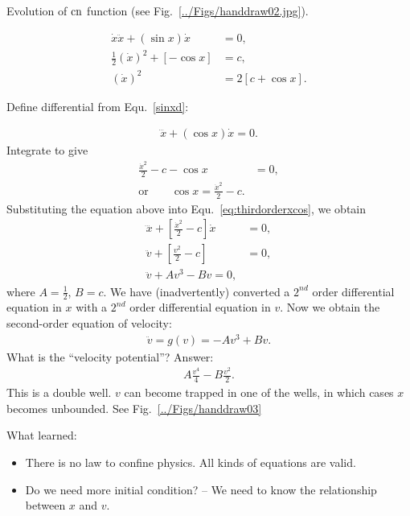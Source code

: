 Evolution of $\mathrm{cn}$ function (see Fig.~\ref{../Figs/handdraw02.jpg}).

\begin{align}
\dot{x}\ddot{x} + (\sin x) \dot{x} &=0,\\
\frac{1}{2} \left( \dot{x} \right)^2 +[-\cos x] &= c,\\
\left( \dot{x} \right)^2 &= 2[c +\cos x].
\end{align}

Define differential from Equ.~\ref{sinxd}:

\begin{align}
\dddot{x} + (\cos x)\dot{x} =0 . \label{eq:thirdorderxcos}
\end{align}
Integrate to give
\begin{align}
\frac{\dot{x}^2}{2}-c - \cos x &=0,\\
\textrm{or}\quad \quad \cos x= \frac{\dot{x}^2}{2}-c.
\end{align}
Substituting the equation above into Equ.~\ref{eq:thirdorderxcos}, we obtain
\begin{align}
\dddot{x}+[\frac{\dot{x}^2}{2}-c] \dot{x} &=0,\\
\ddot{v}+ [\frac{v^2}{2}-c] &=0,\\
\ddot{v}+A v^3 - Bv=0,
\end{align}
where $A=\frac{1}{2}$, $B=c$.
We have (inadvertently) converted a $2^{nd}$ order differential equation in $x$ with  a $2^{nd}$ order differential equation in $v$. Now we obtain the second-order equation of velocity:
\begin{align}
\ddot{v}= g(v)= -A v^3+Bv.
\end{align}
What is the ``velocity potential''? Answer: 
\begin{align}
A\frac{v^4}{4} -B\frac{v^2}{2}.
\end{align}
This is a double well. $ v $ can become trapped in one of the wells, in which cases $x$ becomes
unbounded. See Fig.~\ref{../Figs/handdraw03}

What learned:
\begin{itemize}
\item There is no law to confine physics. All kinds of equations are valid.
\item Do we need more initial condition? -- We need to know the relationship between $x$ and $v$.
\end{itemize}

